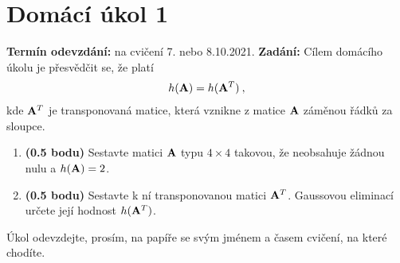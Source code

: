\section*{Domácí úkol 1}
\textbf{Termín odevzdání:} na cvičení 7. nebo 8.10.2021.
\newline
\textbf{Zadání:} Cílem domácího úkolu je přesvědčit se, že platí \begin{align*}
    h(\mathbf{A}) = h(\mathbf{A}^T)  \:,
\end{align*}
kde $\mathbf{A}^T$ je transponovaná matice, která vznikne z matice $\mathbf{A}$ záměnou řádků za sloupce.

\begin{enumerate}
    \item \textbf{(0.5 bodu)} Sestavte matici $\mathbf{A}$ typu $4 \times 4$ takovou, že neobsahuje žádnou nulu a $h(\mathbf{A}) = 2$. 
    \item \textbf{(0.5 bodu)} Sestavte k ní transponovanou matici $\mathbf{A}^T$. Gaussovou eliminací určete její hodnost $h(\mathbf{A}^T)$. 
\end{enumerate}

Úkol odevzdejte, prosím, na papíře se svým jménem a časem cvičení, na které chodíte.